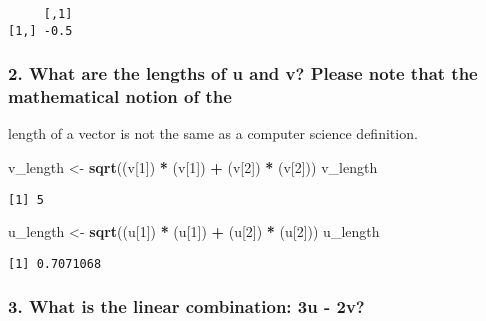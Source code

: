 \documentclass[]{article}
\newenvironment{Shaded}{\begin{snugshade}}{\end{snugshade}}
\newcommand{\DecValTok}[1]{\textcolor[rgb]{0.00,0.00,0.81}{#1}}
\newcommand{\KeywordTok}[1]{\textcolor[rgb]{0.13,0.29,0.53}{\textbf{#1}}}
\newcommand{\NormalTok}[1]{#1}
\newcommand{\OperatorTok}[1]{\textcolor[rgb]{0.81,0.36,0.00}{\textbf{#1}}}
\newcommand{\StringTok}[1]{\textcolor[rgb]{0.31,0.60,0.02}{#1}}
\begin{document}
\begin{verbatim}
     [,1]
[1,] -0.5
\end{verbatim}

\hypertarget{what-are-the-lengths-of-u-and-v-please-note-that-the-mathematical-notion-of-the}{%
\subsubsection{2. What are the lengths of u and v? Please note that the
mathematical notion of
the}\label{what-are-the-lengths-of-u-and-v-please-note-that-the-mathematical-notion-of-the}}

length of a vector is not the same as a computer science definition.

\begin{Shaded}
\begin{Highlighting}[]
\NormalTok{v_length <-}\StringTok{ }\KeywordTok{sqrt}\NormalTok{((v[}\DecValTok{1}\NormalTok{]) }\OperatorTok{*}\StringTok{ }\NormalTok{(v[}\DecValTok{1}\NormalTok{]) }\OperatorTok{+}\StringTok{ }\NormalTok{(v[}\DecValTok{2}\NormalTok{]) }\OperatorTok{*}\StringTok{ }\NormalTok{(v[}\DecValTok{2}\NormalTok{]))}
\NormalTok{v_length}
\end{Highlighting}
\end{Shaded}

\begin{verbatim}
[1] 5
\end{verbatim}

\begin{Shaded}
\begin{Highlighting}[]
\NormalTok{u_length <-}\StringTok{ }\KeywordTok{sqrt}\NormalTok{((u[}\DecValTok{1}\NormalTok{]) }\OperatorTok{*}\StringTok{ }\NormalTok{(u[}\DecValTok{1}\NormalTok{]) }\OperatorTok{+}\StringTok{ }\NormalTok{(u[}\DecValTok{2}\NormalTok{]) }\OperatorTok{*}\StringTok{ }\NormalTok{(u[}\DecValTok{2}\NormalTok{]))}
\NormalTok{u_length}
\end{Highlighting}
\end{Shaded}

\begin{verbatim}
[1] 0.7071068
\end{verbatim}

\hypertarget{what-is-the-linear-combination-3u---2v}{%
\subsubsection{3. What is the linear combination: 3u -
2v?}\label{what-is-the-linear-combination-3u---2v}}
\end{document}
